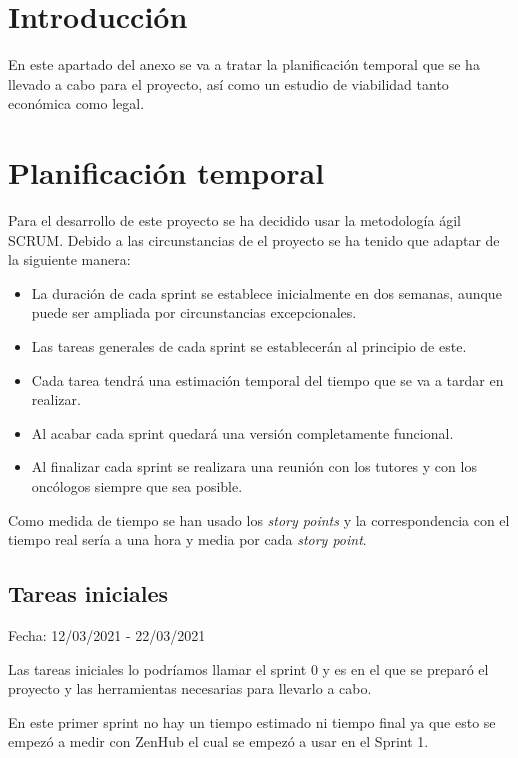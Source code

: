 
\section{Introducción}

En este apartado del anexo se va a tratar la planificación temporal que se ha llevado a cabo para el proyecto, así como un estudio de viabilidad tanto económica como legal.

\section{Planificación temporal}

Para el desarrollo de este proyecto se ha decidido usar la metodología ágil SCRUM. Debido a las circunstancias de el proyecto se ha tenido que adaptar de la siguiente manera: 

\begin{itemize}
    \item La duración de cada sprint se establece inicialmente en dos semanas, aunque puede ser ampliada por circunstancias excepcionales.
    \item Las tareas generales de cada sprint se establecerán al principio de este.
    \item Cada tarea tendrá una estimación temporal del tiempo que se va a tardar en realizar.
    \item Al acabar cada sprint quedará una versión completamente funcional.
    \item Al finalizar cada sprint se realizara una reunión con los tutores y con los oncólogos siempre que sea posible.
\end{itemize}

Como medida de tiempo se han usado los \textit{story points} y la correspondencia con el tiempo real sería a una hora y media por cada \textit{story point}.

\subsection{Tareas iniciales}

Fecha: 12/03/2021 - 22/03/2021

Las tareas iniciales lo podríamos llamar el sprint 0 y es en el que se preparó el proyecto y las herramientas necesarias para llevarlo a cabo.

En este primer sprint no hay un tiempo estimado ni tiempo final ya que esto se empezó a medir con ZenHub el cual se empezó a usar en el Sprint 1.

